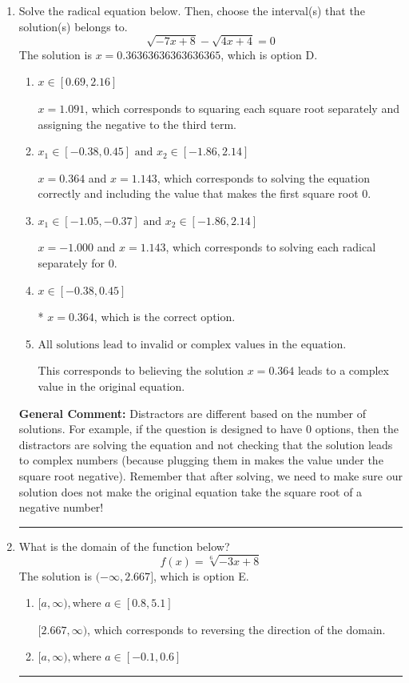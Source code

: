 \documentclass{extbook}[14pt]
\newcommand{\litem}[1]{\item #1

\rule{\textwidth}{0.4pt}}
\begin{document}
\begin{enumerate}\litem{
Solve the radical equation below. Then, choose the interval(s) that the solution(s) belongs to.
\[ \sqrt{-7 x + 8} - \sqrt{4 x + 4} = 0 \]The solution is \( x = 0.36363636363636365 \), which is option D.\begin{enumerate}[label=\Alph*.]
\item \( x \in [0.69,2.16] \)

$x = 1.091$, which corresponds to squaring each square root separately and assigning the negative to the third term.
\item \( x_1 \in [-0.38, 0.45] \text{ and } x_2 \in [-1.86,2.14] \)

$x = 0.364$ and $x = 1.143$, which corresponds to solving the equation correctly and including the value that makes the first square root 0.
\item \( x_1 \in [-1.05, -0.37] \text{ and } x_2 \in [-1.86,2.14] \)

$x = -1.000$ and $x = 1.143$, which corresponds to solving each radical separately for 0.
\item \( x \in [-0.38,0.45] \)

* $x = 0.364$, which is the correct option.
\item \( \text{All solutions lead to invalid or complex values in the equation.} \)

This corresponds to believing the solution $x = 0.364$ leads to a complex value in the original equation.
\end{enumerate}

\textbf{General Comment:} Distractors are different based on the number of solutions. For example, if the question is designed to have 0 options, then the distractors are solving the equation and not checking that the solution leads to complex numbers (because plugging them in makes the value under the square root negative). Remember that after solving, we need to make sure our solution does not make the original equation take the square root of a negative number!
}
\litem{
What is the domain of the function below?
\[ f(x) = \sqrt[6]{-3 x + 8} \]The solution is \( (-\infty, 2.667] \), which is option E.\begin{enumerate}[label=\Alph*.]
\item \( [a, \infty), \text{where } a \in [0.8, 5.1] \)

 $[2.667, \infty)$, which corresponds to reversing the direction of the domain.
\item \( [a, \infty), \text{where } a \in [-0.1, 0.6] \)


\end{enumerate}}
\end{enumerate}
\end{document}
